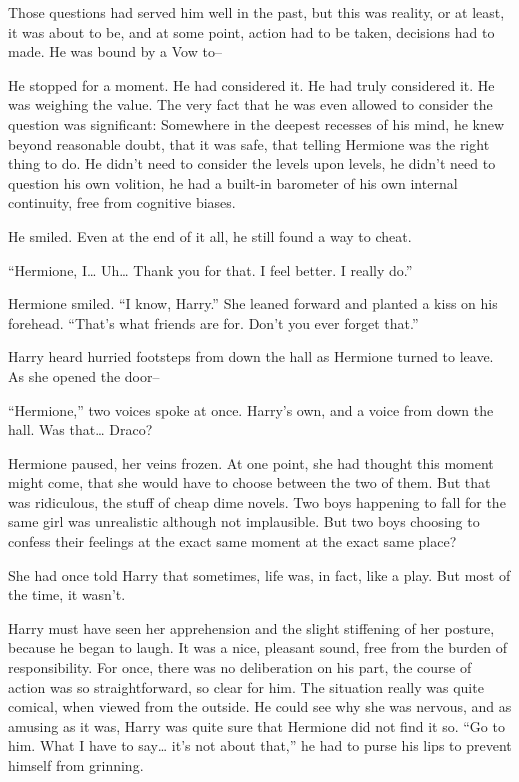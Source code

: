 Those questions had served him well in the past, but this was reality, or at least, it was about to be, and at some point, action had to be taken, decisions had to made. He was bound by a Vow to–

He stopped for a moment. He had considered it. He had truly considered it. He was weighing the value.  The very fact that he was even allowed to consider the question was significant: Somewhere in the deepest recesses of his mind, he knew beyond reasonable doubt, that it was safe, that telling Hermione was the right thing to do. He didn’t need to consider the levels upon levels, he didn’t need to question his own volition, he had a built-in barometer of his own internal continuity, free from cognitive biases.

He smiled. Even at the end of it all, he still found a way to cheat.

“Hermione, I… Uh… Thank you for that. I feel better. I really do.”

Hermione smiled. “I know, Harry.” She leaned forward and planted a kiss on his forehead. “That’s what friends are for. Don’t you ever forget that.”

Harry heard hurried footsteps from down the hall as Hermione turned to leave. As she opened the door–

“Hermione,” two voices spoke at once.  Harry’s own, and a voice from down the hall. Was that… Draco?

Hermione paused, her veins frozen. At one point, she had thought this moment might come, that she would have to choose between the two of them. But that was ridiculous, the stuff of cheap dime novels. Two boys happening to fall for the same girl was unrealistic although not implausible. But two boys choosing to confess their feelings at the exact same moment at the exact same place?

She had once told Harry that sometimes, life was, in fact, like a play. But most of the time, it wasn’t.

Harry must have seen her apprehension and the slight stiffening of her posture, because he began to laugh. It was a nice, pleasant sound, free from the burden of responsibility. For once, there was no deliberation on his part, the course of action was so straightforward, so clear for him. The situation really was quite comical, when viewed from the outside. He could see why she was nervous, and as amusing as it was, Harry was quite sure that Hermione did not find it so. “Go to him. What I have to say… it’s not about that,” he had to purse his lips  to prevent himself from grinning.

